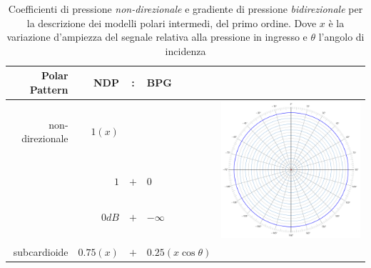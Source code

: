 \begin{table}[ht]
\caption{Coefficienti di pressione \emph{non-direzionale} e gradiente di pressione
\emph{bidirezionale} per la descrizione dei modelli polari intermedi, del primo ordine.
Dove $x$ è la variazione d'ampiezza del segnale relativa alla pressione in
ingresso e $\theta$ l'angolo di incidenza}
\begin{center}
\begin{tabular}{rrcll}
\textbf{Polar Pattern} & \textbf{NDP} & : & \textbf{BPG} &\\
\hline
non-direzionale & $1(x)$       &     &                      &
 \multirow{4}{*}{\begin{minipage}{.25\textwidth}\includegraphics[width=\linewidth]{CAPITOLI/_TIKZ/POLAR/omni}\end{minipage}} \\
                & $1$          & $+$ & $0$                  & \\
                & $0dB$        & $+$ & $-\infty$         & \\ %
& \\
\hline
subcardioide    & $0.75(x)$    & $+$ & $0.25(x\cos\theta)$  &

\end{tabular}
\end{center}
\end{table}
